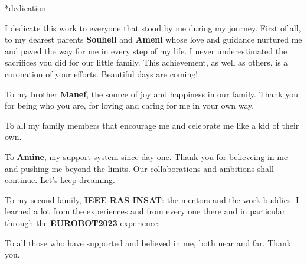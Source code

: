 \newenvironment*{Abstract}{
\renewcommand*{\abstractname}{\Huge \textbf{Abstract}}
\begin{abstract}
\end{abstract}}


\newenvironment*{dedication}{
\renewcommand*{\abstractname}{\begin{flushleft}\Huge \textbf{Dedication}\end{flushleft}}
\begin{abstract}
\end{abstract}}

\newenvironment*{acknowledgement}{
  \renewcommand*{\abstractname}{\begin{flushleft}\Huge \textbf{Acknowledgement}\end{flushleft}}
  \begin{abstract}
 {}
  \end{abstract}
}


\newpage

\begin{dedication}

I dedicate this work to everyone that stood by me during my journey.
First of all, to my dearest parents \textbf{Souheil} and \textbf{Ameni}
whose love and guidance nurtured me and paved the way for me in every step
of my life. I never underestimated the sacrifices you did for our little 
family. This achievement, as well as others, is a coronation of 
your efforts. Beautiful days are coming!

To my brother \textbf{Manef}, the source of joy and happiness in our family. 
Thank you for being who you are, for loving and caring for me in your own way.

To all my family members that encourage me and celebrate me like a kid of their own.

To \textbf{Amine}, my support system since day one. Thank you for believeing in me
and pushing me beyond the limits. Our collaborations and ambitions shall continue.
Let's keep dreaming.

To my second family, \textbf{IEEE RAS INSAT}: the mentors and the work buddies.
I learned a lot from the experiences and from every one there and in particular 
through the \textbf{EUROBOT2023} experience. 

To all those who have supported and believed in me, both near and far. Thank you.


\end{dedication}

